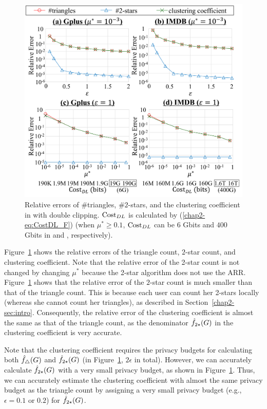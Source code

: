 \begin{figure}[t]
  \centering
  \includegraphics[width=0.99\linewidth]{fig/res5_cluster.pdf}
  
  \caption{Relative errors of \#triangles, \#$2$-stars, and the clustering coefficient in \AlgTwo{} with double clipping.
  $\mathrm{Cost}_{DL}$ is calculated by (\ref{chap2-eq:CostDL_F})
  (when $\mu^* \geq 0.1$,
  $\mathrm{Cost}_{DL}$ can be $6$ Gbits and $400$ Gbits in \GPlus{} and \IMDB{}, respectively).
  }
  \label{chap2-fig:res5_cluster}
\end{figure}

Figure~\ref{chap2-fig:res5_cluster} shows the relative errors of the triangle count, $2$-star count, and clustering coefficient.
Note that the relative error of the 2-star count is not changed by changing
$\mu^*$
because the 2-star algorithm does not use the ARR.
Figure~\ref{chap2-fig:res5_cluster} shows that the relative error of the $2$-star count is much smaller than that of the triangle count.
This is because each user can count her 2-stars locally (whereas she cannot count her triangles), as described in Section~\ref{chap2-sec:intro}.
Consequently, the relative error of the clustering coefficient is almost the same as that of the triangle count, as the denominator $\hat{f}_{2\star}(G)$ in the clustering coefficient is very accurate.

Note that the clustering coefficient requires the privacy budgets for
calculating both $\hat{f}_\triangle(G)$ and $\hat{f}_{2\star}(G)$
(in Figure~\ref{chap2-fig:res5_cluster}, $2\epsilon$ in total).
However, we can accurately
calculate $\hat{f}_{2\star}(G)$
with a very small privacy budget, as shown in Figure~\ref{chap2-fig:res5_cluster}.
Thus, we can accurately estimate the clustering coefficient with almost the same privacy budget as
the triangle count
by assigning a very small privacy budget (e.g., $\epsilon=0.1$ or $0.2$) for
$\hat{f}_{2\star}(G)$.


